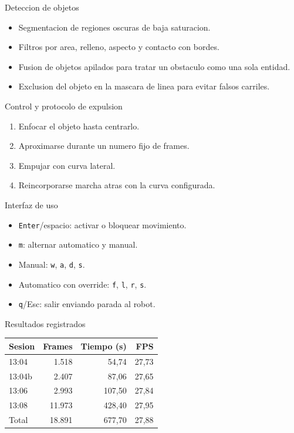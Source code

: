 \documentclass[aspectratio=169]{beamer}
\begin{document}
\begin{frame}{Deteccion de objetos}
  \begin{itemize}
    \item Segmentacion de regiones oscuras de baja saturacion.
    \item Filtros por area, relleno, aspecto y contacto con bordes.
    \item Fusion de objetos apilados para tratar un obstaculo como una sola entidad.
    \item Exclusion del objeto en la mascara de linea para evitar falsos carriles.
  \end{itemize}
\end{frame}

\begin{frame}{Control y protocolo de expulsion}
  \begin{enumerate}
    \item Enfocar el objeto hasta centrarlo.
    \item Aproximarse durante un numero fijo de frames.
    \item Empujar con curva lateral.
    \item Reincorporarse marcha atras con la curva configurada.
  \end{enumerate}
\end{frame}

\begin{frame}{Interfaz de uso}
  \begin{itemize}
    \item \texttt{Enter}/espacio: activar o bloquear movimiento.
    \item \texttt{m}: alternar automatico y manual.
    \item Manual: \texttt{w}, \texttt{a}, \texttt{d}, \texttt{s}.
    \item Automatico con override: \texttt{f}, \texttt{l}, \texttt{r}, \texttt{s}.
    \item \texttt{q}/Esc: salir enviando parada al robot.
  \end{itemize}
\end{frame}

\begin{frame}{Resultados registrados}
  \begin{table}
    \centering
    \begin{tabular}{lrrr}
      \toprule
      Sesion & Frames & Tiempo (s) & FPS \\
      \midrule
      13:04 & 1.518 & 54,74 & 27,73 \\
      13:04b & 2.407 & 87,06 & 27,65 \\
      13:06 & 2.993 & 107,50 & 27,84 \\
      13:08 & 11.973 & 428,40 & 27,95 \\
      \midrule
      Total & 18.891 & 677,70 & 27,88 \\
      \bottomrule
    \end{tabular}
  \end{table}
\end{frame}
\end{document}
